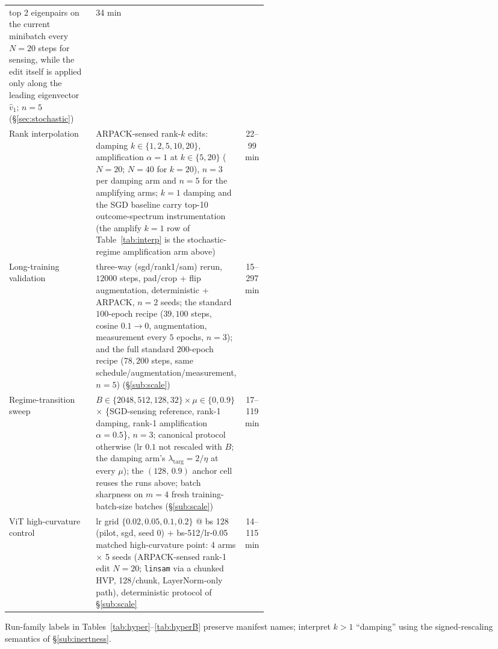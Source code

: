 \documentclass{article}
\theoremstyle{plain}
\theoremstyle{definition}
\theoremstyle{remark}
\begin{document}
\begin{table}[!ht]
{\begin{tabular}{lp{0.50\linewidth}c}
top 2 eigenpairs on the current minibatch every $N{=}20$ steps for
sensing, while the edit itself is applied only along the leading
eigenvector $\hat v_{1}$; $n{=}5$ (\S\ref{sec:stochastic}) & 34 min \\
\addlinespace[1.5pt]
Rank interpolation & ARPACK-sensed rank-$k$ edits: damping
$k\in\{1,2,5,10,20\}$, amplification $\alpha{=}1$ at $k\in\{5,20\}$
($N{=}20$; $N{=}40$ for $k{=}20$), $n{=}3$ per damping arm and $n{=}5$
for the amplifying arms; $k{=}1$ damping and the SGD
baseline carry top-10 outcome-spectrum instrumentation (the amplify $k{=}1$
row of Table~\ref{tab:interp} is the stochastic-regime amplification arm above)
& 22--99 min \\
\addlinespace[1.5pt]
Long-training validation & three-way (sgd/rank1/sam) rerun, $12000$ steps,
pad/crop + flip augmentation, deterministic + ARPACK, $n{=}2$ seeds; the
standard $100$-epoch recipe ($39{,}100$ steps, cosine $0.1\!\to\!0$,
augmentation, measurement every $5$ epochs, $n{=}3$); and the full standard
$200$-epoch recipe ($78{,}200$ steps, same schedule/augmentation/measurement,
$n{=}5$) (\S\ref{sub:scale}) & 15--297 min \\
\addlinespace[1.5pt]
Regime-transition sweep & $B\in\{2048,512,128,32\}\times\mu\in\{0,0.9\}$
$\times$ \{SGD-sensing reference, rank-1 damping, rank-1 amplification
$\alpha{=}0.5$\}, $n{=}3$; canonical protocol otherwise (lr $0.1$ not
rescaled with $B$; the damping arm's $\lambda_{\mathrm{targ}}{=}2/\eta$ at every
$\mu$); the $(128,\,0.9)$ anchor cell reuses the runs above; batch
sharpness on $m{=}4$ fresh training-batch-size batches
(\S\ref{sub:scale}) & 17--119 min \\
\addlinespace[1.5pt]
ViT high-curvature control & lr grid $\{0.02,0.05,0.1,0.2\}$ @ bs 128 (pilot,
sgd, seed 0) $+$ bs-512/lr-0.05 matched high-curvature point: 4 arms $\times$ 5 seeds
(ARPACK-sensed rank-1 edit $N{=}20$; \texttt{linsam} via a chunked HVP,
128/chunk, LayerNorm-only path), deterministic protocol of
\S\ref{sub:scale} & 14--115 min \\
\bottomrule
\end{tabular}}
\end{table}

\noindent Run-family labels in Tables~\ref{tab:hyper}--\ref{tab:hyperB}
preserve manifest names; interpret $k{>}1$ ``damping'' using the
signed-rescaling semantics of \S\ref{sub:inertness}.
\end{document}
